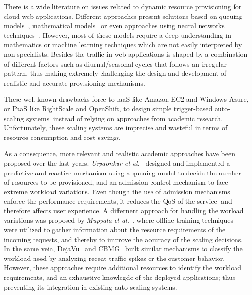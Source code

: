 
There is a wide literature on issues related to dynamic resource provisioning for cloud web applications. Different approaches present solutions based on queuing models~\cite{urgaonkar_agile_2008}, mathematical models~\cite{muppala_regression-based_2012} or even approaches using neural networks techniques~\cite{islam_empirical_2012}. However, most of these models require a deep understanding in mathematics or machine learning techniques which are not easily interpreted by non specialists. Besides the traffic in web applications is shaped by a combination of different factors such as diurnal/seasonal cycles that follows an irregular pattern, thus making extremely challenging the design and development of realistic and accurate provisioning mechanisms. 

These well-known drawbacks force to IaaS like Amazon EC2 and Windows Azure, or PaaS like RightScale and OpenShift,  to design simple trigger-based auto-scaling systems, instead of relying on approaches from academic research. Unfortunately, these scaling systems are imprecise and wasteful in terms of resource consumption and cost savings. %

As a consequence, more relevant and realistic academic approaches have been proposed over the last years. \emph{Urgaonkar et al.}~\cite{urgaonkar_agile_2008} designed and implemented a predictive and reactive mechanism using a queuing model to decide the number of resources to be provisioned, and an admission control mechanism to face extreme workload variations. 
Even though the use of admission mechanisms enforce the performance requirements, it reduces the QoS of the service, and therefore affects user experience. A differnent approach for handling the worload variations was proposed by \emph{Muppala et al.}~\cite{muppala_regression-based_2012}, where offline training techniques were utilized to gather information about the resource requirements of the incoming requests, and thereby to improve the accuracy of the scaling decisions. In the same vein, DejaVu~\cite{vasic_dejavu_2012} and CBMG~\cite{roy_efficient_2011} built similar mechanisms to classify the workload need by analyzing recent traffic spikes or the customer behavior. However, these approaches require additional resources to identify the workload requirements, and an exhaustive knowlegde of the deployed applications; thus preventing its integration in existing auto scaling systems.


